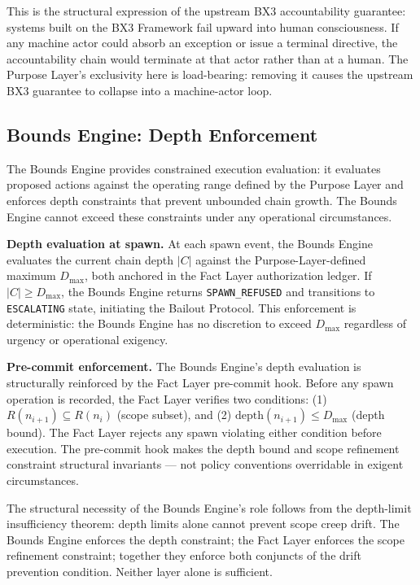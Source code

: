 This is the structural expression of the upstream BX3 accountability guarantee: systems built on the BX3 Framework fail upward into human consciousness. If any machine actor could absorb an exception or issue a terminal directive, the accountability chain would terminate at that actor rather than at a human. The Purpose Layer's exclusivity here is load-bearing: removing it causes the upstream BX3 guarantee to collapse into a machine-actor loop.

\subsection{Bounds Engine: Depth Enforcement}
\label{sec:rs-bounds-depth}

The Bounds Engine provides constrained execution evaluation: it evaluates proposed actions against the operating range defined by the Purpose Layer and enforces depth constraints that prevent unbounded chain growth. The Bounds Engine cannot exceed these constraints under any operational circumstances.

\medskip
\noindent\textbf{Depth evaluation at spawn.} At each spawn event, the Bounds Engine evaluates the current chain depth $|C|$ against the Purpose-Layer-defined maximum $D_{\mathrm{max}}$, both anchored in the Fact Layer authorization ledger. If $|C| \geq D_{\mathrm{max}}$, the Bounds Engine returns \texttt{SPAWN\_REFUSED} and transitions to \texttt{ESCALATING} state, initiating the Bailout Protocol. This enforcement is deterministic: the Bounds Engine has no discretion to exceed $D_{\mathrm{max}}$ regardless of urgency or operational exigency.

\medskip
\noindent\textbf{Pre-commit enforcement.} The Bounds Engine's depth evaluation is structurally reinforced by the Fact Layer pre-commit hook. Before any spawn operation is recorded, the Fact Layer verifies two conditions: (1) $R(n_{i+1}) \subseteq R(n_i)$ (scope subset), and (2) $\mathrm{depth}(n_{i+1}) \leq D_{\mathrm{max}}$ (depth bound). The Fact Layer rejects any spawn violating either condition before execution. The pre-commit hook makes the depth bound and scope refinement constraint structural invariants --- not policy conventions overridable in exigent circumstances.

The structural necessity of the Bounds Engine's role follows from the depth-limit insufficiency theorem: depth limits alone cannot prevent scope creep drift. The Bounds Engine enforces the depth constraint; the Fact Layer enforces the scope refinement constraint; together they enforce both conjuncts of the drift prevention condition. Neither layer alone is sufficient.

